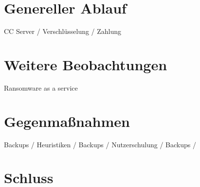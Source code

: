 \section{Genereller Ablauf}
 CC Server / Verschlüsselung / Zahlung

\section{Weitere Beobachtungen}
Ransomware as a service

\section{Gegenmaßnahmen}
 
Backups / Heuristiken / Backups / Nutzerschulung / Backups / 

\section{Schluss}


